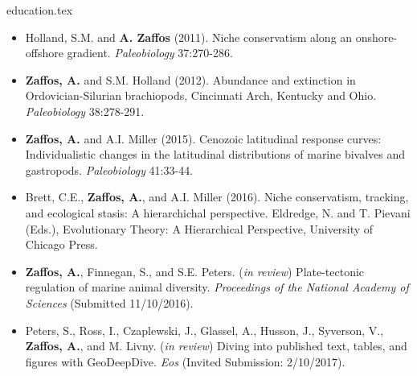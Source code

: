 \documentclass[12pt, a4paper]{awesome-cv}
\newcommand*{\sectiondir}{resume/}
\begin{document}
\makecvheader

{education.tex}
\vspace{-20pt}

\fontsize{10pt}{1em}\bodyfontlight\upshape\color{text}
\begin{itemize}[leftmargin=*]
\item{Holland, S.M. and \textbf{A. Zaffos} (2011). Niche conservatism along an onshore-offshore gradient. \textit{Paleobiology} 37:270-286.}
\item{\textbf{Zaffos, A.} and S.M. Holland (2012). Abundance and extinction in Ordovician-Silurian brachiopods, Cincinnati Arch, Kentucky and Ohio. \textit{Paleobiology} 38:278-291.}
\item{\textbf{Zaffos, A.} and A.I. Miller (2015). Cenozoic latitudinal response curves: Individualistic changes in the latitudinal distributions of marine bivalves and gastropods. \textit{Paleobiology} 41:33-44.}
\item{Brett, C.E., \textbf{Zaffos, A.}, and A.I. Miller (2016). Niche conservatism, tracking, and ecological stasis: A hierarchichal perspective. Eldredge, N. and T. Pievani (Eds.), Evolutionary Theory: A Hierarchical Perspective, University of Chicago Press.}
\item{\textbf{Zaffos, A.}, Finnegan, S., and S.E. Peters. (\textit{in review}) Plate-tectonic regulation of marine animal diversity. \textit{Proceedings of the National Academy of Sciences} (Submitted 11/10/2016).}
\item{Peters, S., Ross, I., Czaplewski, J., Glassel, A., Husson, J., Syverson, V., \textbf{Zaffos, A.}, and M. Livny. (\textit{in review}) Diving into published text, tables, and figures with GeoDeepDive. \textit{Eos} (Invited Submission: 2/10/2017).}
\end{itemize}
\end{document}
